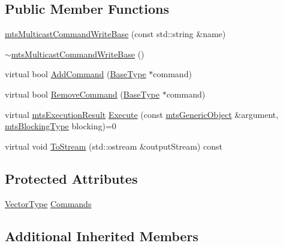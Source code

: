 \subsection*{Public Member Functions}
\begin{DoxyCompactItemize}
\item 
\hyperlink{classmts_multicast_command_write_base_a03fecc30b28f9ae0623eb8a8ba36c5d2}{mts\-Multicast\-Command\-Write\-Base} (const std\-::string \&name)
\item 
\hyperlink{classmts_multicast_command_write_base_af80f325cb7023dcef286ecaafe189841}{$\sim$mts\-Multicast\-Command\-Write\-Base} ()
\item 
virtual bool \hyperlink{classmts_multicast_command_write_base_a7163c96ed8d25927ea074bacfae410e1}{Add\-Command} (\hyperlink{classmts_command_write_base_a5d78c8590cfc73fa29d93b3678cba199}{Base\-Type} $\ast$command)
\item 
virtual bool \hyperlink{classmts_multicast_command_write_base_a2dd321ec3867b87877a7d8875e4dc896}{Remove\-Command} (\hyperlink{classmts_command_write_base_a5d78c8590cfc73fa29d93b3678cba199}{Base\-Type} $\ast$command)
\item 
virtual \hyperlink{classmts_execution_result}{mts\-Execution\-Result} \hyperlink{classmts_multicast_command_write_base_ab8a9cde81c9d5653defafd2093383a51}{Execute} (const \hyperlink{classmts_generic_object}{mts\-Generic\-Object} \&argument, \hyperlink{mts_forward_declarations_8h_ad7426ccb6c883bc780d0ee197dddcbe7}{mts\-Blocking\-Type} blocking)=0
\item 
virtual void \hyperlink{classmts_multicast_command_write_base_a1a82c8eadcc87d4617302be657120876}{To\-Stream} (std\-::ostream \&output\-Stream) const 
\end{DoxyCompactItemize}
\subsection*{Protected Attributes}
\begin{DoxyCompactItemize}
\item 
\hyperlink{classmts_multicast_command_write_base_a25953a3da11d172a87774cfebe55eaa9}{Vector\-Type} \hyperlink{classmts_multicast_command_write_base_a908fccc3c249bf9a0919f2294defc73e}{Commands}
\end{DoxyCompactItemize}
\subsection*{Additional Inherited Members}


